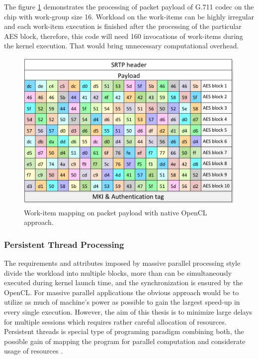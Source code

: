 The figure \ref{mp_payload} demonstrates the processing of packet payload of 
G.711 codec on the chip with work-group size 16. Workload on the work-items can
be highly irregular and each work-item execution is finished after the 
processing of the particular AES block, therefore, this code will need 160
invocations of work-items during the kernel execution. That would bring
unnecessary computational overhead.    

\begin{figure}[H]
\centering
\includegraphics[width=13cm]{fig/packet_mp.pdf}
\caption{Work-item mapping on packet payload with native OpenCL approach.}
\label{mp_payload}
\end{figure}



\subsubsection*{Persistent Thread Processing}
The requirements and attributes imposed by massive parallel processing
style divide the workload into multiple blocks, more than can be simultaneously
executed during kernel launch time, and the synchronization is ensured by the
OpenCL. For massive parallel applications the obvious approach would be to 
utilize as much of machine's power as possible to gain the largest speed-up in 
every single execution. However, the aim of this thesis is to minimize large 
delays for multiple sessions which requires rather careful allocation of
resources. Persistent threads is special type of programing paradigm combining 
both, the possible gain of mapping the program for parallel computation and
considerate usage of resources \cite{pt}.

